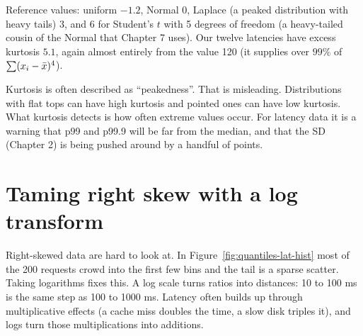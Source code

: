 Reference values: uniform $-1.2$, Normal $0$, Laplace (a peaked distribution with heavy tails) $3$, and $6$ for Student's $t$
with 5 degrees of freedom (a heavy-tailed cousin of the Normal that Chapter 7 uses). Our twelve latencies have excess kurtosis $5.1$, again almost entirely from
the value 120 (it supplies over $99\%$ of $\sum (x_i - \bar{x})^4$).

\begin{trapbox}
Kurtosis is often described as ``peakedness''. That is misleading. Distributions with
flat tops can have high kurtosis and pointed ones can have low kurtosis. What kurtosis
detects is how often extreme values occur. For latency data it is a warning that p99
and p99.9 will be far from the median, and that the SD (Chapter 2) is being pushed
around by a handful of points.
\end{trapbox}

\section{Taming right skew with a log transform}

Right-skewed data are hard to look at. In Figure~\ref{fig:quantiles-lat-hist} most of
the 200 requests crowd into the first few bins and the tail is a sparse scatter. Taking
logarithms fixes this. A log scale turns ratios into distances: 10 to 100 ms is the same
step as 100 to 1000 ms. Latency often builds up through multiplicative effects (a cache
miss doubles the time, a slow disk triples it), and logs turn those multiplications
into additions.

